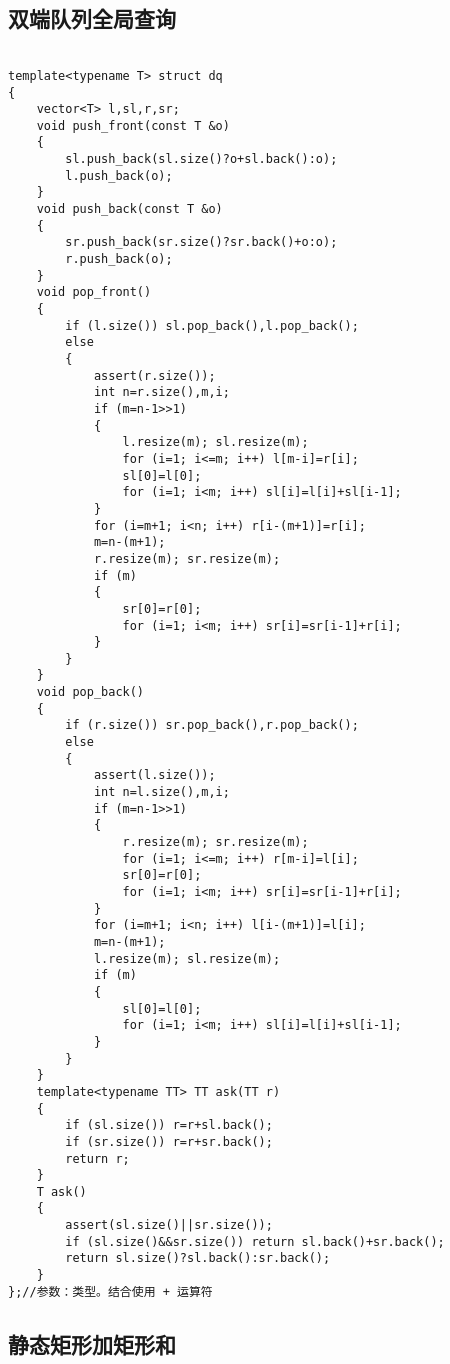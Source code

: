 \documentclass[12pt]{ctexart}
\begin{document}
\subsection{双端队列全局查询}

\begin{lstlisting}

template<typename T> struct dq
{
	vector<T> l,sl,r,sr;
	void push_front(const T &o)
	{
		sl.push_back(sl.size()?o+sl.back():o);
		l.push_back(o);
	}
	void push_back(const T &o)
	{
		sr.push_back(sr.size()?sr.back()+o:o);
		r.push_back(o);
	}
	void pop_front()
	{
		if (l.size()) sl.pop_back(),l.pop_back();
		else
		{
			assert(r.size());
			int n=r.size(),m,i;
			if (m=n-1>>1)
			{
				l.resize(m); sl.resize(m);
				for (i=1; i<=m; i++) l[m-i]=r[i];
				sl[0]=l[0];
				for (i=1; i<m; i++) sl[i]=l[i]+sl[i-1];
			}
			for (i=m+1; i<n; i++) r[i-(m+1)]=r[i];
			m=n-(m+1);
			r.resize(m); sr.resize(m);
			if (m)
			{
				sr[0]=r[0];
				for (i=1; i<m; i++) sr[i]=sr[i-1]+r[i];
			}
		}
	}
	void pop_back()
	{
		if (r.size()) sr.pop_back(),r.pop_back();
		else
		{
			assert(l.size());
			int n=l.size(),m,i;
			if (m=n-1>>1)
			{
				r.resize(m); sr.resize(m);
				for (i=1; i<=m; i++) r[m-i]=l[i];
				sr[0]=r[0];
				for (i=1; i<m; i++) sr[i]=sr[i-1]+r[i];
			}
			for (i=m+1; i<n; i++) l[i-(m+1)]=l[i];
			m=n-(m+1);
			l.resize(m); sl.resize(m);
			if (m)
			{
				sl[0]=l[0];
				for (i=1; i<m; i++) sl[i]=l[i]+sl[i-1];
			}
		}
	}
	template<typename TT> TT ask(TT r)
	{
		if (sl.size()) r=r+sl.back();
		if (sr.size()) r=r+sr.back();
		return r;
	}
	T ask()
	{
		assert(sl.size()||sr.size());
		if (sl.size()&&sr.size()) return sl.back()+sr.back();
		return sl.size()?sl.back():sr.back();
	}
};//参数：类型。结合使用 + 运算符

\end{lstlisting}

\subsection{静态矩形加矩形和}
\end{document}
